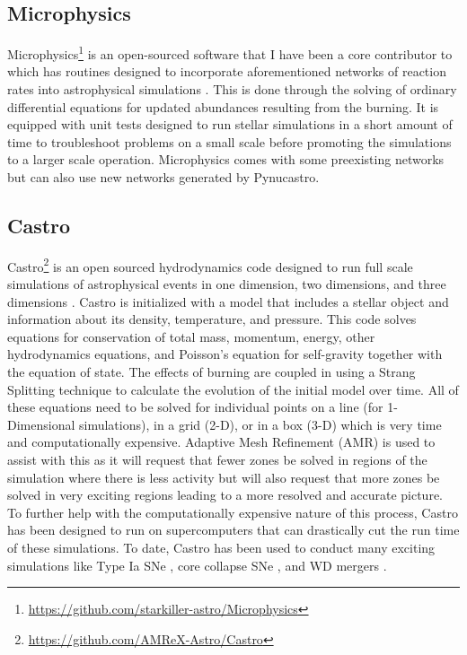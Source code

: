 \documentclass[preprint]{aastex62}
\begin{document}
  \subsection{Microphysics}
  
    Microphysics\footnote{\url{https://github.com/starkiller-astro/Microphysics}} is an open-sourced software that I have been a core contributor to which has routines designed to incorporate aforementioned networks of reaction rates into astrophysical simulations \citep{Microphysics}. This is done through the solving of ordinary differential equations for updated abundances resulting from the burning. It is equipped with unit tests designed to run stellar simulations in a short amount of time to troubleshoot problems on a small scale before promoting the simulations to a larger scale operation. Microphysics comes with some preexisting networks but can also use new networks generated by Pynucastro. 
  
  \newpage
  
  \subsection{Castro}
  
    Castro\footnote{\url{https://github.com/AMReX-Astro/Castro}} is an open sourced hydrodynamics code designed to run full scale simulations of astrophysical events in one dimension, two dimensions, and three dimensions \citep{castro}. Castro is initialized with a model that includes a stellar object and information about its density, temperature, and pressure. This code solves equations for conservation of total mass, momentum, energy, other hydrodynamics equations, and Poisson's equation for self-gravity together with the equation of state. The effects of burning are coupled in using a Strang Splitting technique \citep{strang} to calculate the evolution of the initial model over time. All of these equations need to be solved for individual points on a line (for 1-Dimensional simulations), in a grid (2-D), or in a box (3-D) which is very time and computationally expensive. Adaptive Mesh Refinement (AMR) is used to assist with this as it will request that fewer zones be solved in regions of the simulation where there is less activity but will also request that more zones be solved in very exciting regions leading to a more resolved and accurate picture. To further help with the computationally expensive nature of this process, Castro has been designed to run on supercomputers that can drastically cut the run time of these simulations. To date, Castro has been used to conduct many exciting simulations like Type Ia SNe \citep{subch1, subch2}, core collapse SNe \citep{corecollapse1, corecollapse2}, and WD mergers \citep{merger}. 
  
\end{document}
